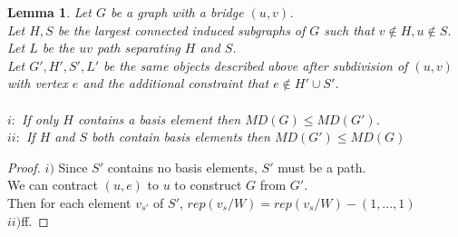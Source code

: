 \documentclass[11pt]{amsart}
\theoremstyle{plain}  %
\newtheorem{lem}[thm]{Lemma}
\theoremstyle{definition}
\theoremstyle{remark}
\numberwithin{equation}{thm}
\begin{document}
\begin{lem}
 Let $G$ be a graph with a bridge $(u,v)$.\\
 Let $H, S$ be the largest connected induced subgraphs of $G$ such that $v\notin H, u\notin S$.\\
 Let $L$ be the $uv$ path separating $H$ and $S$.\\
 Let $G', H', S', L'$ be the same objects described above after subdivision of $(u,v)$ with vertex $e$ and the additional constraint that
 $e \notin H' \cup S'$.\\
 \\
 $i:$ If only $H$ contains a basis element then $MD(G)\leq MD(G')$.\\
 $ii:$ If $H$ and $S$ both contain basis elements then $MD(G')\leq MD(G)$
\end{lem}
\begin{proof}
 $i)$ Since $S'$ contains no basis elements, $S'$ must be a path.\\
 We can contract $(u,e)$ to $u$ to construct $G$ from $G'$.\\
 Then for each element $v_{s'}$ of $S'$, $rep(v_s/W) = rep(v_s/W) - (1,...,1)$ 
 \\$ii)$ff.
\end{proof}


 






\cite{Chartrand:2010:GDF:1941879}
\nocite{*}

\end{document}
